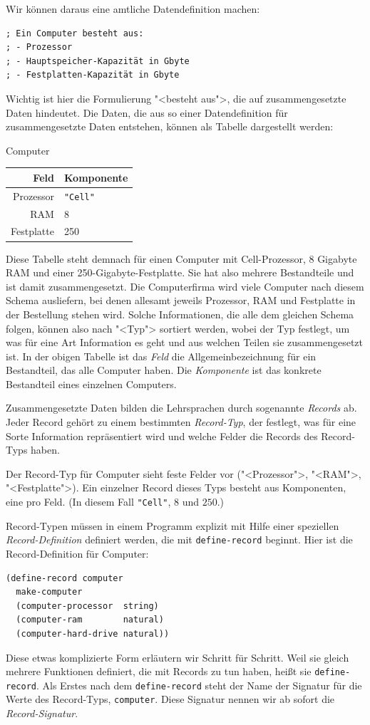 Wir können daraus eine amtliche Datendefinition machen:
%
\begin{lstlisting}
; Ein Computer besteht aus:
; - Prozessor
; - Hauptspeicher-Kapazität in Gbyte
; - Festplatten-Kapazität in Gbyte
\end{lstlisting}
%
Wichtig ist hier die Formulierung "<besteht aus">, die auf
zusammengesetzte Daten hindeutet.  Die Daten, die aus so einer
Datendefinition für zusammengesetzte Daten entstehen, können als
Tabelle dargestellt werden:
%
\begin{center}
  Computer\qquad
  \begin{tabular}[c]{r|l}
    \textbf{Feld} & \textbf{Komponente}\\\hline
     Prozessor & \verb|"Cell"|\\
     RAM & 8\\
    Festplatte & 250
  \end{tabular}
\end{center}
%
Diese Tabelle steht demnach für einen Computer mit Cell-Prozessor, 8
Gigabyte RAM und einer 250-Gigabyte-Festplatte.  Sie hat also mehrere
Bestandteile und ist damit zusammengesetzt.  Die Computerfirma wird
viele Computer nach diesem Schema ausliefern, bei denen allesamt
jeweils Prozessor, RAM und Festplatte in der Bestellung stehen wird.  Solche
Informationen, die alle dem gleichen Schema folgen, können also nach
"<Typ"> sortiert werden, wobei der Typ
festlegt, um was für eine Art Information es geht und aus welchen
Teilen sie zusammengesetzt ist.  In der obigen Tabelle ist das
\textit{Feld} die Allgemeinbezeichnung für ein Bestandteil, das
alle Computer haben.  Die \textit{Komponente} ist das konkrete
Bestandteil eines einzelnen Computers.

Zusammengesetzte Daten bilden die Lehrsprachen durch
sogenannte \textit{Records} ab.  Jeder Record gehört
zu einem bestimmten
\textit{Record-Typ}, der festlegt, was für eine
Sorte Information repräsentiert wird und welche Felder die Records
des Record-Typs haben.

Der Record-Typ für Computer sieht feste Felder
vor ("<Prozessor">, "<RAM">, "<Festplatte">).  Ein einzelner Record
dieses Typs besteht aus Komponenten, eine pro
Feld. (In diesem Fall \lstinline{"Cell"}, $8$ und $250$.)

Record-Typen müssen in einem Programm explizit mit Hilfe einer
speziellen \textit{Record-Definition} definiert werden, die mit
\lstinline{define-record} beginnt.  Hier ist die
Record-Definition für
Computer:
%
\begin{lstlisting}
(define-record computer
  make-computer
  (computer-processor  string)
  (computer-ram        natural)
  (computer-hard-drive natural))
\end{lstlisting}
%
Diese etwas komplizierte Form erläutern wir Schritt für Schritt.  Weil sie gleich mehrere
Funktionen definiert, die mit Records zu tun haben, heißt
sie \lstinline{define-record}.  Als Erstes nach
dem \lstinline{define-record} steht der Name der Signatur für
die Werte des Record-Typs,
\lstinline{computer}.  Diese Signatur nennen wir ab sofort die
\textit{Record-Signatur}.

